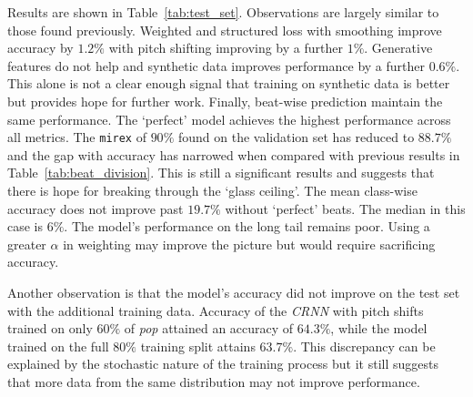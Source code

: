 Results are shown in Table~\ref{tab:test_set}. Observations are largely similar to those found previously. Weighted and structured loss with smoothing improve accuracy by $1.2\%$ with pitch shifting improving by a further $1\%$. Generative features do not help and synthetic data improves performance by a further $0.6\%$. This alone is not a clear enough signal that training on synthetic data is better but provides hope for further work. Finally, beat-wise prediction maintain the same performance. The `perfect' model achieves the highest performance across all metrics. The \texttt{mirex} of $90\%$ found on the validation set has reduced to $88.7\%$ and the gap with accuracy has narrowed when compared with previous results in Table~\ref{tab:beat_division}. This is still a significant results and suggests that there is hope for breaking through the `glass ceiling'. The mean class-wise accuracy does not improve past $19.7\%$ without `perfect' beats. The median in this case is $6\%$. The model's performance on the long tail remains poor. Using a greater $\alpha$ in weighting may improve the picture but would require sacrificing accuracy.

Another observation is that the model's accuracy did not improve on the test set with the additional training data. Accuracy of the \emph{CRNN} with pitch shifts trained on only $60\%$ of \emph{pop} attained an accuracy of $64.3\%$, while the model trained on the full $80\%$ training split attains $63.7\%$. This discrepancy can be explained by the stochastic nature of the training process but it still suggests that more data from the same distribution may not improve performance. 

